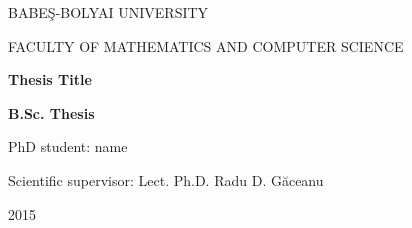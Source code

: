 \documentclass[a4paper, 12pt, english]{report}
\begin{document}
\begin{titlepage}
\sloppy
\begin{center}
\Large{BABE\c{S}-BOLYAI UNIVERSITY}

\Large{FACULTY OF MATHEMATICS AND COMPUTER SCIENCE}

 

\vspace{8cm}
\Huge \textbf{Thesis Title}

\vspace{1.3cm}
\Large \textbf{B.Sc. Thesis}
\end{center}
\vspace{4cm}
\begin{flushright}
\Large{PhD student: name}

\Large{Scientific supervisor: Lect. Ph.D. Radu D. G\u{a}ceanu}

\end{flushright}

\vspace{2cm}

\begin{center}
\Large{2015}
\end{center}

\end{titlepage}




\tableofcontents
\listoffigures
\listoftables











\renewcommand\bibname{Bibliography}

%
%

 
\end{document}
